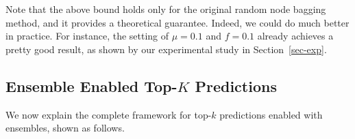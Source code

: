Note that the above bound holds only for the original random node bagging method, and it provides a theoretical guarantee.
Indeed, we could do much better in practice. For instance, the setting of $\mu = 0.1$ and $f = 0.1$ already achieves a pretty good result, as shown by our experimental study in Section~\ref{sec-exp}.

\subsection{Ensemble Enabled Top-$K$ Predictions}




We now explain the complete framework for top-$k$ predictions enabled with ensembles, shown as follows.

